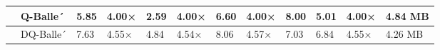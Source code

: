 \begin{tabular}{llllllllllll}
\toprule
 & Q-Balle´ & 5.85 & 4.00× & 2.59 & 4.00× & 6.60 & 4.00× & 8.00 & 5.01 & 4.00× & 4.84 MB \\
\midrule
 & DQ-Balle´ & 7.63 & 4.55× & 4.84 & 4.54× & 8.06 & 4.57× & 7.03 & 6.84 & 4.55× & 4.26 MB \\
\bottomrule
\end{tabular}
